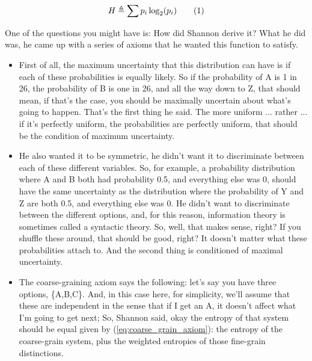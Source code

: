 \documentclass[]{article}
\newcommand\numberthis{\addtocounter{equation}{1}\tag{\theequation}}
\begin{document}
\begin{align*}
H \triangleq \sum p_i \log_2(p_i) \numberthis \label{eq:shannon:entropy}
\end{align*}

One of the questions you might have is:
How did Shannon derive it?
What he did was,
he came up with a series of axioms
that he wanted this function to satisfy.

\begin{itemize}
	\item First of all, the maximum uncertainty
	that this distribution can have
	is if each of these probabilities
	is equally likely.
	So if the probability of A is 1 in 26,
	the probability of B is one in 26,
	and all the way down to Z,
	that should mean, if that's the case,
	you should be maximally uncertain
	about what's going to happen.
	That's the first thing he said.
	The more uniform ... rather ...
	if it's perfectly uniform,
	the probabilities are perfectly uniform,
	that should be the condition
	of maximum uncertainty.
	\item He also wanted it to be symmetric,
	he didn't want it to discriminate
	between each of these different variables.
	So, for example,
	a probability distribution
	where A and B both had probability 0.5,
	and everything else was 0,
	should have the same uncertainty
	as the distribution where the probability
	of Y and Z are both 0.5,
	and everything else was 0.
	He didn't want to discriminate
	between the different options,
	and, for this reason, information theory
	is sometimes called a syntactic theory.
	So, well, that makes sense, right?
	If you shuffle these around,
	that should be good, right?
	It doesn't matter
	what these probabilities attach to.
	And the second thing
	is conditioned of maximal uncertainty.
	\item The coarse-graining axiom says the following: let's say you have three options, \{A,B,C\}.
	And, in this case here, for simplicity,
	we'll assume that these are independent
	in the sense that if I get an A,
	it doesn't affect
	what I'm going to get next;
	So, Shannon said, okay
	the entropy of that system
	should be equal given by (\ref{eq:coarse_grain_axiom}): the entropy of the coarse-grain system, plus the weighted entropies of those fine-grain distinctions.
\end{itemize}
\end{document}
